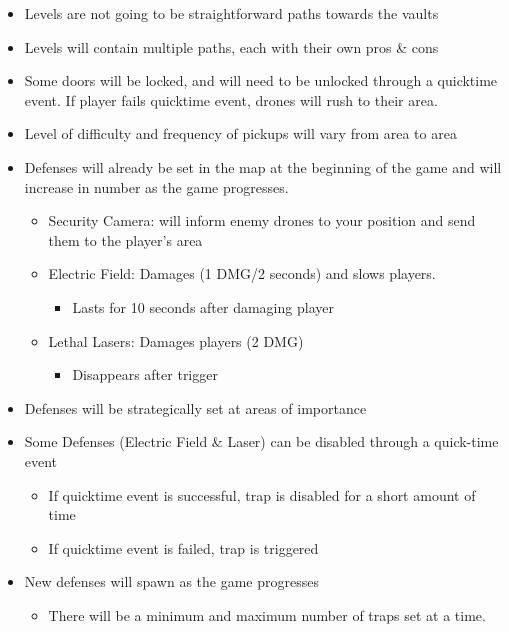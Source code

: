 \documentclass[10pt]{report}
\begin{document}
\begin{itemize}
    \item Levels are not going to be straightforward paths towards the vaults
    \item Levels will contain multiple paths, each with their own pros \& cons
    \item Some doors will be locked, and will need to be unlocked through a quicktime event. If player fails quicktime event, drones will rush to their area.
    \item Level of difficulty and frequency of pickups will vary from area to area
    \item Defenses will already be set in the map at the beginning of the game and will increase in number as the game progresses.
    \begin{itemize}
        \item Security Camera: will inform enemy drones to your position and send them to the player’s area
        \item Electric Field: Damages (1 DMG/2 seconds) and slows players.
        \begin{itemize}
            \item Lasts for 10 seconds after damaging player
        \end{itemize}
        \item Lethal Lasers: Damages players (2 DMG)
        \begin{itemize}
            \item Disappears after trigger
        \end{itemize}
    \end{itemize}
    \item Defenses will be strategically set at areas of importance
    \item Some Defenses (Electric Field \& Laser) can be disabled through a quick-time event
    \begin{itemize}
        \item If quicktime event is successful, trap is disabled for a short amount of time
        \item If quicktime event is failed, trap is triggered
    \end{itemize}
    \item New defenses will spawn as the game progresses
    \begin{itemize}
        \item There will be a minimum and maximum number of traps set at a time.
    \end{itemize}
\end{itemize}
\end{document}
